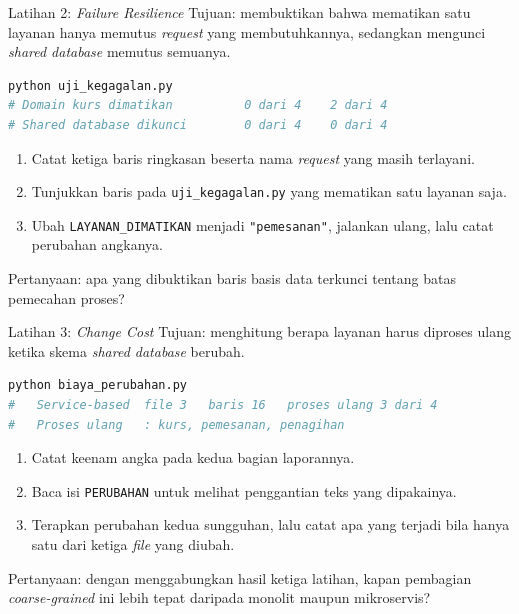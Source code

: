 \documentclass[aspectratio=169, table, 12pt]{beamer}
\begin{document}
\begin{frame}[fragile]{{\Large Latihan 2: \textit{Failure Resilience}}}
  \vspace{8pt}
  {\small Tujuan: membuktikan bahwa mematikan satu layanan hanya memutus
  \textit{request} yang membutuhkannya, sedangkan mengunci \textit{shared
  database} memutus semuanya.}
\begin{lstlisting}[language=bash]
python uji_kegagalan.py
# Domain kurs dimatikan          0 dari 4    2 dari 4
# Shared database dikunci        0 dari 4    0 dari 4
\end{lstlisting}

  \begin{enumerate}\small
    \item Catat ketiga baris ringkasan beserta nama \textit{request} yang masih
          terlayani.
    \item Tunjukkan baris pada \texttt{uji\_kegagalan.py} yang mematikan satu
          layanan saja.
    \item Ubah \texttt{LAYANAN\_DIMATIKAN} menjadi \texttt{"pemesanan"},
          jalankan ulang, lalu catat perubahan angkanya.
  \end{enumerate}

  {\small Pertanyaan: apa yang dibuktikan baris basis data terkunci tentang
  batas pemecahan proses?}
\end{frame}

\begin{frame}[fragile]{{\Large Latihan 3: \textit{Change Cost}}}
  \vspace{8pt}
  {\small Tujuan: menghitung berapa layanan harus diproses ulang ketika skema
  \textit{shared database} berubah.}
\begin{lstlisting}[language=bash]
python biaya_perubahan.py
#   Service-based  file 3   baris 16   proses ulang 3 dari 4
#   Proses ulang   : kurs, pemesanan, penagihan
\end{lstlisting}

  \begin{enumerate}\small
    \item Catat keenam angka pada kedua bagian laporannya.
    \item Baca isi \texttt{PERUBAHAN} untuk melihat penggantian teks yang
          dipakainya.
    \item Terapkan perubahan kedua sungguhan, lalu catat apa yang terjadi bila
          hanya satu dari ketiga \textit{file} yang diubah.
  \end{enumerate}

  {\small Pertanyaan: dengan menggabungkan hasil ketiga latihan, kapan
  pembagian \textit{coarse-grained} ini lebih tepat daripada monolit maupun
  mikroservis?}
\end{frame}
\end{document}
